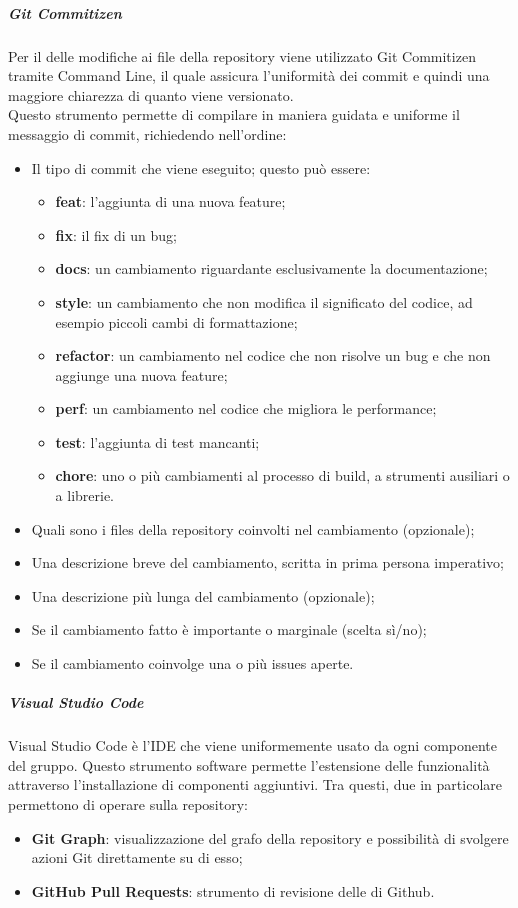 \documentclass[../norme-di-progetto.tex]{subfiles}
\begin{document}
\subparagraph*{Git Commitizen}
Per il  delle modifiche ai file della repository viene utilizzato Git Commitizen tramite Command Line, il quale assicura l'uniformità dei commit e quindi una maggiore chiarezza di quanto viene versionato. \\ Questo strumento permette di compilare in maniera guidata e uniforme il messaggio di commit, richiedendo nell'ordine:
\begin{itemize}
  \item Il tipo di commit che viene eseguito; questo può essere:
  \begin{itemize}
    \item \textbf{feat}: l'aggiunta di una nuova feature;
    \item \textbf{fix}: il fix di un bug;
    \item \textbf{docs}: un cambiamento riguardante esclusivamente la documentazione;
    \item \textbf{style}: un cambiamento che non modifica il significato del codice, ad esempio piccoli cambi di formattazione;
    \item \textbf{refactor}: un cambiamento nel codice che non risolve un bug e che non aggiunge una nuova feature;
    \item \textbf{perf}: un cambiamento nel codice che migliora le performance;
    \item \textbf{test}: l'aggiunta di test mancanti;
    \item \textbf{chore}: uno o più cambiamenti al processo di build, a strumenti ausiliari o a librerie.
  \end{itemize}
  \item Quali sono i files della repository coinvolti nel cambiamento (opzionale);
  \item Una descrizione breve del cambiamento, scritta in prima persona imperativo;
  \item Una descrizione più lunga del cambiamento (opzionale);
  \item Se il cambiamento fatto è importante o marginale (scelta sì/no);
  \item Se il cambiamento coinvolge una o più issues aperte.
\end{itemize}

\subparagraph*{Visual Studio Code}
Visual Studio Code è l'IDE che viene uniformemente usato da ogni componente del gruppo. Questo strumento software permette l'estensione delle funzionalità attraverso l'installazione di componenti aggiuntivi. Tra questi, due in particolare permettono di operare sulla repository:
\begin{itemize}
  \item \textbf{Git Graph}: visualizzazione del grafo della repository e possibilità di svolgere azioni Git direttamente su di esso;
  \item \textbf{GitHub Pull Requests}: strumento di revisione delle  di Github.
\end{itemize}
\end{document}

